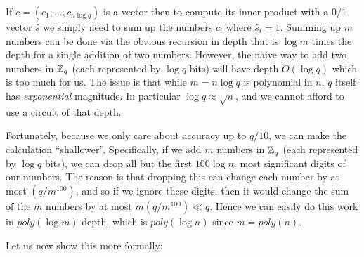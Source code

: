 
If \(c=(c_1,\ldots,c_{n\log q})\) is a vector then to compute its inner
product with a \(0/1\) vector \(\hat{s}\) we simply need to sum up the
numbers \(c_i\) where \(\hat{s}_i=1\). Summing up \(m\) numbers can be
done via the obvious recursion in depth that is \(\log m\) times the
depth for a single addition of two numbers. However, the naive way to
add two numbers in \({\mathbb{Z}}_q\) (each represented by \(\log q\) bits) will
have depth \(O(\log q)\) which is too much for us. The issue is that
while \(m = n\log q\) is polynomial in \(n\), \(q\) itself has
\emph{exponential} magnitude. In particular \(\log q \approx \sqrt{n}\),
and we cannot afford to use a circuit of that depth.


Fortunately, because we only care about accuracy up to \(q/10\), we can
make the calculation ``shallower''. Specifically, if we add \(m\)
numbers in \({\mathbb{Z}}_q\) (each represented by \(\log q\) bits), we can drop
all but the first \(100\log m\) most significant digits of our numbers.
The reason is that dropping this can change each number by at most
\((q/m^{100})\), and so if we ignore these digits, then it would change
the sum of the \(m\) numbers by at most \(m(q/m^{100}) \ll q\). Hence we
can easily do this work in \(poly(\log m)\) depth, which is
\(poly(\log n)\) since \(m=poly(n)\).

Let us now show this more formally:

\hypertarget{decdepthlem}{}

